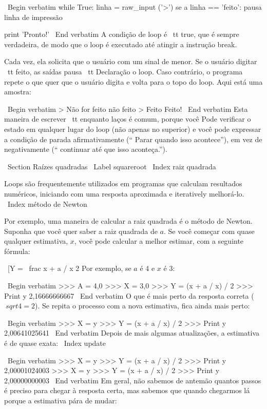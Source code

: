 \documentclass[10pt]{book}
\begin{document}
{{{{\ Begin {verbatim}
while True:
    linha = raw_input ('>')
    se a linha == 'feito':
        pausa
    linha de impressão

print 'Pronto!'
\ End {verbatim}
%
A condição de loop é {\ tt true}, que é sempre verdadeira, de modo que o
loop é executado até atingir a instrução break.

Cada vez, ela solicita que o usuário com um sinal de menor.
Se o usuário digitar {\ tt feito}, as saídas {pausa \ tt} Declaração
o loop. Caso contrário, o programa repete o que quer que o usuário digita
e volta para o topo do loop. Aqui está uma amostra:

\ Begin {verbatim}
> Não for feito
não feito
> Feito
Feito!
\ End {verbatim}
%
Esta maneira de escrever {\ tt enquanto} laços é comum, porque você
Pode verificar o estado em qualquer lugar do loop (não apenas no
superior) e você pode expressar a condição de parada afirmativamente
(`` Parar quando isso acontece''), em vez de negativamente (`` continuar
até que isso aconteça.'').


\ Section {Raízes quadradas}
\ Label {} squareroot
\ Index {raiz quadrada}

Loops são frequentemente utilizados em programas que calculam
resultados numéricos, iniciando com uma resposta aproximada e
iteratively melhorá-lo.
\ Index {método de Newton}

Por exemplo, uma maneira de calcular a raiz quadrada é o método de Newton.
Suponha que você quer saber a raiz quadrada de $ a $. Se você começar
com quase qualquer estimativa, $ x $, você pode calcular a melhor
estimar, com a seguinte fórmula:

\ [Y = \ frac {x + a / x} {2} \]
%
Por exemplo, se $ a $ é 4 e $ x $ é 3:

\ Begin {verbatim}
>>> A = 4,0
>>> X = 3,0
>>> Y = (x + a / x) / 2
>>> Print y
2,16666666667
\ End {verbatim}
%
O que é mais perto da resposta correta ($ \ sqrt {4} = 2 $). Se
repita o processo com a nova estimativa, fica ainda mais perto:

\ Begin {verbatim}
>>> X = y
>>> Y = (x + a / x) / 2
>>> Print y
2,00641025641
\ End {verbatim}
%
Depois de mais algumas atualizações, a estimativa é de quase exata:
\ Index {update}

\ Begin {verbatim}
>>> X = y
>>> Y = (x + a / x) / 2
>>> Print y
2,00001024003
>>> X = y
>>> Y = (x + a / x) / 2
>>> Print y
2,00000000003
\ End {verbatim}
%
Em geral, não sabemos de antemão quantos passos é preciso
para chegar à resposta certa, mas sabemos que quando chegarmos lá
porque a estimativa
pára de mudar:

}}}}
\end{document}
